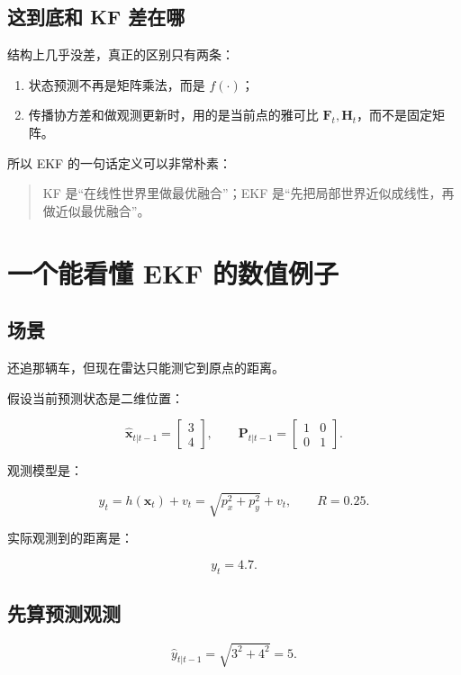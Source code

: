 \documentclass[12pt,a4paper]{ctexart}
\begin{document}
\subsection{这到底和 KF 差在哪}

结构上几乎没差，真正的区别只有两条：

\begin{enumerate}
  \item 状态预测不再是矩阵乘法，而是 \(f(\cdot)\)；
  \item 传播协方差和做观测更新时，用的是当前点的雅可比 \(\bm{F}_t,\bm{H}_t\)，而不是固定矩阵。
\end{enumerate}

所以 EKF 的一句话定义可以非常朴素：

\begin{quote}
KF 是“在线性世界里做最优融合”；EKF 是“先把局部世界近似成线性，再做近似最优融合”。
\end{quote}

\section{一个能看懂 EKF 的数值例子}

\subsection{场景}

还追那辆车，但现在雷达只能测它到原点的距离。

假设当前预测状态是二维位置：

\[
\hat{\bm{x}}_{t|t-1} =
\begin{bmatrix}
3\\
4
\end{bmatrix},
\qquad
\bm{P}_{t|t-1} =
\begin{bmatrix}
1 & 0\\
0 & 1
\end{bmatrix}.
\]

观测模型是：

\[
y_t = h(\bm{x}_t) + v_t
= \sqrt{p_x^2 + p_y^2} + v_t,
\qquad
R = 0.25.
\]

实际观测到的距离是：

\[
y_t = 4.7.
\]

\subsection{先算预测观测}

\[
\hat{y}_{t|t-1}
= \sqrt{3^2 + 4^2}
= 5.
\]
\end{document}
